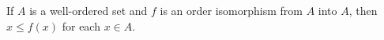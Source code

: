 If $A$ is a well-ordered set and $f$ is an order isomorphism from $A$ into $A$, then $x \leq f(x)$ for each $x \in A$.